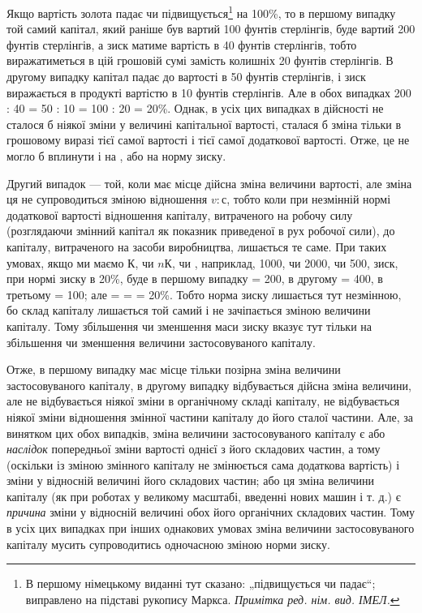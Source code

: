 \parcont{}  %
Якщо вартість золота падає чи підвищується\footnote*{
В першому німецькому виданні тут сказано: „підвищується чи падає“;
виправлено на підставі рукопису Маркса. \emph{Примітка ред. нім. вид. ІМЕЛ.}
} на 100\%, то
в першому випадку той самий капітал, який раніше був вартий
100 фунтів стерлінгів, буде вартий 200 фунтів стерлінгів, а зиск
матиме вартість в 40 фунтів стерлінгів, тобто виражатиметься
в цій грошовій сумі замість колишніх 20 фунтів стерлінгів.
В другому випадку капітал падає до вартості в 50 фунтів
стерлінгів, і зиск виражається в продукті вартістю в 10 фунтів
стерлінгів. Але в обох випадках 200 : 40 = 50 : 10 = 100 : 20 = 20\%.
Однак, в усіх цих випадках в дійсності не сталося б ніякої
зміни у величині капітальної вартості, сталася б зміна тільки
в грошовому виразі тієї самої вартості і тієї самої додаткової
вартості. Отже, це не могло б вплинути і на , або на норму
зиску.

Другий випадок — той, коли має місце дійсна зміна величини
вартості, але зміна ця не супроводиться зміною відношення
$v : с$, тобто коли при незмінній нормі додаткової вартості відношення
капіталу, витраченого на робочу силу (розглядаючи
змінний капітал як показник приведеної в рух робочої сили), до
капіталу, витраченого на засоби виробництва, лишається те
саме. При таких умовах, якщо ми маємо $К$, чи $nК$, чи , наприклад,
1000, чи 2000, чи 500, зиск, при нормі зиску в 20\%,
буде в першому випадку = 200, в другому = 400, в третьому = 100;
але  =  =  = 20\%. Тобто норма зиску лишається тут
незмінною, бо склад капіталу лишається той самий і не зачіпається
зміною величини капіталу. Тому збільшення чи зменшення
маси зиску вказує тут тільки на збільшення чи зменшення
величини застосовуваного капіталу.

Отже, в першому випадку має місце тільки позірна зміна
величини застосовуваного капіталу, в другому випадку відбувається
дійсна зміна величини, але не відбувається ніякої зміни
в органічному складі капіталу, не відбувається ніякої зміни
відношення змінної частини капіталу до його сталої частини.
Але, за винятком цих обох випадків, зміна величини застосовуваного
капіталу є або \emph{наслідок} попередньої зміни вартості
однієї з його складових частин, а тому (оскільки із зміною змінного
капіталу не змінюється сама додаткова вартість) і зміни
у відносній величині його складових частин; або ця зміна величини
капіталу (як при роботах у великому масштабі, введенні нових
машин і т. д.) є \emph{причина} зміни у відносній величині обох його
органічних складових частин. Тому в усіх цих випадках при
інших однакових умовах зміна величини застосовуваного капіталу
мусить супроводитись одночасною зміною норми зиску.
